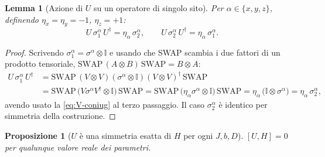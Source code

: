 \documentclass[11pt,a4paper]{article}
\newtheorem{lemma}{Lemma}
\newtheorem{proposizione}{Proposizione}
\begin{document}
\begin{lemma}[Azione di $U$ su un operatore di singolo sito]
\label{lem:U-singolo}
Per $\alpha\in\{x,y,z\}$, definendo $\eta_x=\eta_y=-1$, $\eta_z=+1$:
\begin{equation}
U\,\sigma_1^\alpha\,U^\dagger = \eta_\alpha\,\sigma_2^\alpha,
\qquad
U\,\sigma_2^\alpha\,U^\dagger = \eta_\alpha\,\sigma_1^\alpha.
\end{equation}
\end{lemma}

\begin{proof}
Scrivendo $\sigma_1^\alpha=\sigma^\alpha\otimes\mathbb I$ e usando che SWAP scambia i due fattori
di un prodotto tensoriale, $\mathrm{SWAP}\,(A\otimes B)\,\mathrm{SWAP}=B\otimes A$:
\begin{align}
U\,\sigma_1^\alpha\,U^\dagger
&= \mathrm{SWAP}\,(V\otimes V)(\sigma^\alpha\otimes\mathbb I)(V\otimes V)^\dagger\,\mathrm{SWAP} \\
&= \mathrm{SWAP}\,\big(V\sigma^\alpha V^\dagger\otimes \mathbb I\big)\,\mathrm{SWAP}
= \mathrm{SWAP}\,\big(\eta_\alpha\sigma^\alpha\otimes\mathbb I\big)\,\mathrm{SWAP}
= \eta_\alpha\,\big(\mathbb I\otimes\sigma^\alpha\big) = \eta_\alpha\,\sigma_2^\alpha,
\end{align}
avendo usato la \eqref{eq:V-coniug} al terzo passaggio. Il caso $\sigma_2^\alpha$ è identico per
simmetria della costruzione.
\end{proof}

\begin{proposizione}[$U$ è una simmetria esatta di $H$ per ogni $J,b,D$]
\label{prop:U-simmetria}
$[U,H]=0$ per qualunque valore reale dei parametri.
\end{proposizione}
\end{document}

